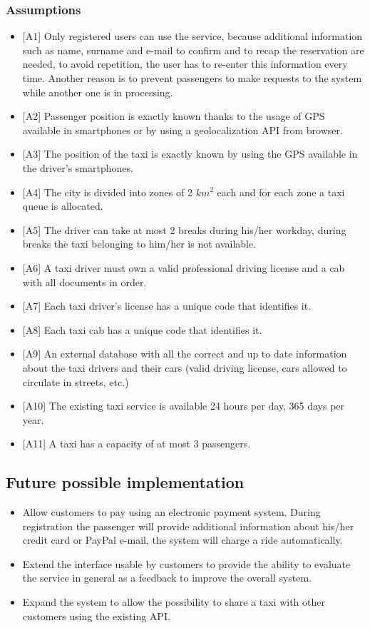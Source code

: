 \documentclass[a4paper,12pt]{article}%
\begin{document}
\subsubsection{Assumptions}
\begin{itemize}
\label{a1} \item {[}A1{]} Only registered users can use the service, because additional information such as name, surname and e-mail to confirm and to recap the reservation are needed, to avoid repetition, the user has to re-enter this information every time.
Another reason is to prevent passengers to make requests to the system while another one is in processing.
\label{a2} \item {[}A2{]} Passenger position is exactly known thanks to the usage of GPS available in smartphones or by using a geolocalization API from browser. 
\label{a3} \item {[}A3{]} The position of the taxi is exactly known by using the GPS available in the driver's smartphones.
\label{a4} \item {[}A4{]} The city is divided into zones of 2 $km^2$ each and for each zone a taxi queue is allocated.
\label{a5} \item {[}A5{]} The driver can take at most 2 breaks during his/her workday, during breaks the taxi belonging to him/her is not available.
\label{a6} \item {[}A6{]} A taxi driver must own a valid professional driving license and a cab with all documents in order.
\label{a7} \item {[}A7{]} Each taxi driver's license has a unique code that identifies it.
\label{a8} \item {[}A8{]} Each taxi cab has a unique code that identifies it.
\label{a9} \item {[}A9{]} An external database with all the correct and up to date information about the taxi drivers and their cars (valid driving license, cars allowed to circulate in streets, etc.)
\label{a10} \item {[}A10{]} The existing taxi service is available 24 hours per day, 365 days per year.
\label{a11} \item {[}A11{]} A taxi has a capacity of at most 3 passengers. 
\end{itemize}
\subsection{Future possible implementation}
\begin{itemize}
\item Allow customers to pay using an electronic payment system. During registration the passenger will provide additional information about his/her credit card or PayPal e-mail, the system will charge a ride automatically.
\item Extend the interface usable by customers to provide the ability to evaluate the service in general as a feedback to improve the overall system.
\item Expand the system to allow the possibility to share a taxi with other customers using the existing API.
\end{itemize}
\newpage
\end{document}
